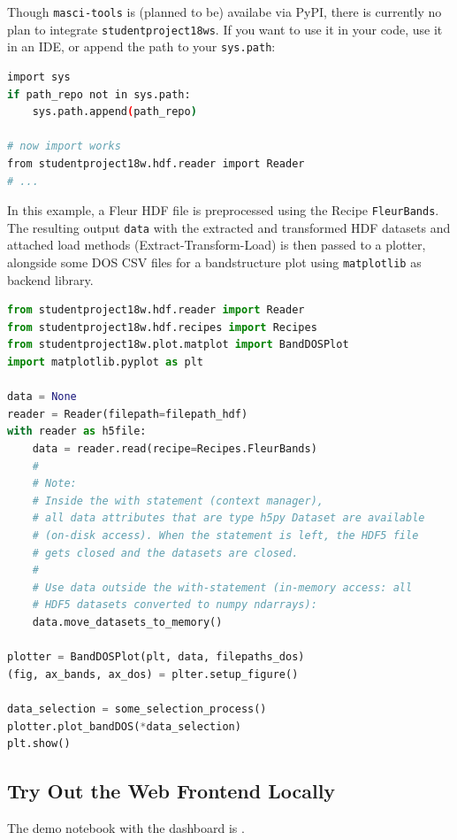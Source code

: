 Though \texttt{masci-tools} is (planned to be) availabe via PyPI, there is
currently no plan to integrate \texttt{studentproject18ws}. If you want to use
it in your code, use it in an IDE, or append the path to your
\texttt{sys.path}:

\begin{lstlisting}[language=bash, style=code]
import sys
if path_repo not in sys.path:
    sys.path.append(path_repo)
    
# now import works
from studentproject18w.hdf.reader import Reader
# ...
\end{lstlisting}

In this example, a Fleur HDF file is preprocessed using the Recipe
\texttt{FleurBands}. The resulting output \texttt{data} with the
extracted and transformed HDF datasets and attached load methods
(Extract-Transform-Load) is then passed to a plotter, alongside some DOS
CSV files for a bandstructure plot using \texttt{matplotlib} as backend
library.

\begin{lstlisting}[language=python, style=code]
from studentproject18w.hdf.reader import Reader
from studentproject18w.hdf.recipes import Recipes
from studentproject18w.plot.matplot import BandDOSPlot
import matplotlib.pyplot as plt

data = None
reader = Reader(filepath=filepath_hdf)
with reader as h5file:
    data = reader.read(recipe=Recipes.FleurBands)
    #
    # Note:
    # Inside the with statement (context manager),
    # all data attributes that are type h5py Dataset are available
    # (on-disk access). When the statement is left, the HDF5 file 
    # gets closed and the datasets are closed.
    #
    # Use data outside the with-statement (in-memory access: all 
    # HDF5 datasets converted to numpy ndarrays):
    data.move_datasets_to_memory()

plotter = BandDOSPlot(plt, data, filepaths_dos)
(fig, ax_bands, ax_dos) = plter.setup_figure()

data_selection = some_selection_process()
plotter.plot_bandDOS(*data_selection)
plt.show()
\end{lstlisting}

\subsection{Try Out the Web Frontend
  Locally}\label{try-out-web-frontend-locally}

The demo notebook with the dashboard is
.

